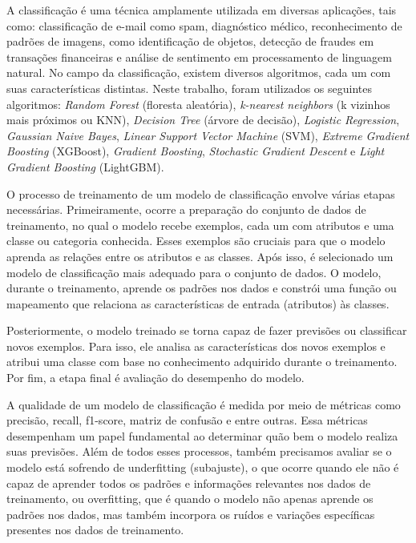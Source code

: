A classificação é uma técnica amplamente utilizada em diversas aplicações, tais como:
classificação de e-mail como spam, diagnóstico médico, reconhecimento de padrões de
imagens, como identificação de objetos, detecção de fraudes em transações financeiras e análise
de sentimento em processamento de linguagem natural. No campo da classificação, existem
diversos algoritmos, cada um com suas características distintas. Neste trabalho, foram
utilizados os seguintes algoritmos: \textit{Random Forest} (floresta aleatória), \textit{k-nearest neighbors} (k vizinhos mais próximos ou KNN), \textit{Decision Tree} (árvore de decisão), \textit{Logistic Regression}, \textit{Gaussian Naive Bayes}, \textit{Linear Support Vector Machine} (SVM), \textit{Extreme Gradient Boosting} (XGBoost), \textit{Gradient Boosting}, \textit{Stochastic Gradient Descent} e \textit{Light Gradient Boosting} (LightGBM).

O processo de treinamento de um modelo de classificação envolve várias etapas
necessárias. Primeiramente, ocorre a preparação do conjunto de dados de treinamento, no qual
o modelo recebe exemplos, cada um com atributos e uma classe ou categoria conhecida. Esses
exemplos são cruciais para que o modelo aprenda as relações entre os atributos e as classes.
Após isso, é selecionado um modelo de classificação mais adequado para o conjunto de dados.
O modelo, durante o treinamento, aprende os padrões nos dados e constrói uma função ou
mapeamento que relaciona as características de entrada (atributos) às classes. 

Posteriormente,
o modelo treinado se torna capaz de fazer previsões ou classificar novos exemplos. Para isso,
ele analisa as características dos novos exemplos e atribui uma classe com base no
conhecimento adquirido durante o treinamento. Por fim, a etapa final é avaliação do
desempenho do modelo. 

A qualidade de um modelo de classificação é medida por meio de
métricas como precisão, recall, f1-score, matriz de confusão e entre outras. Essa métricas
desempenham um papel fundamental ao determinar quão bem o modelo realiza suas previsões.
Além de todos esses processos, também precisamos avaliar se o modelo está sofrendo de
underfitting (subajuste), o que ocorre quando ele não é capaz de aprender todos os padrões e
informações relevantes nos dados de treinamento, ou overfitting, que é quando o modelo não
apenas aprende os padrões nos dados, mas também incorpora os ruídos e variações específicas
presentes nos dados de treinamento.
